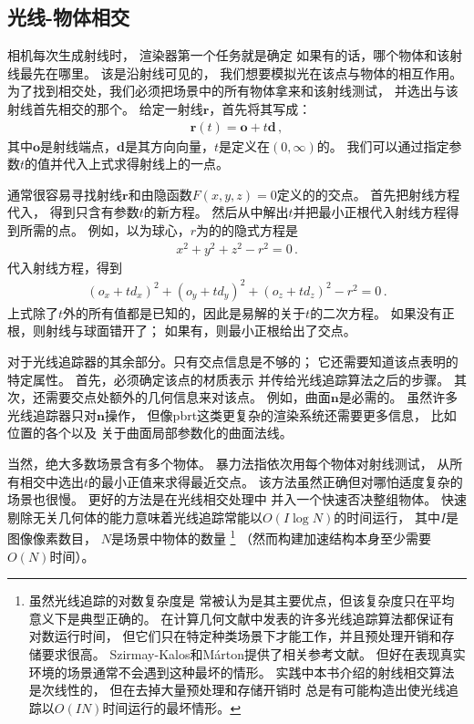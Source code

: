 \subsection{光线-物体相交}\label{sub:光线-物体相交}

相机每次生成射线时，
渲染器第一个任务就是确定
如果有的话，哪个物体和该射线最先在哪里。
该是沿射线可见的，
我们想要模拟光在该点与物体的相互作用。
为了找到相交处，我们必须把场景中的所有物体拿来和该射线测试，
并选出与该射线首先相交的那个。
给定一射线${\bm r}$，首先将其写成：
\begin{align*}
      {\bm r}(t)={\bm o}+t{\bm d}\, ,
\end{align*}
其中${\bm o}$是射线端点，${\bm d}$是其方向向量，$t$是定义在$(0,\infty)$的。
我们可以通过指定参数$t$的值并代入上式求得射线上的一点。

通常很容易寻找射线${\bm r}$和由隐函数$F(x,y,z)=0$定义的的交点。
首先把射线方程代入，
得到只含有参数$t$的新方程。
然后从中解出$t$并把最小正根代入射线方程得到所需的点。
例如，以为球心，$r$为的的隐式方程是
\begin{align*}
      x^2+y^2+z^2-r^2=0\, .
\end{align*}
代入射线方程，得到
\begin{align*}
      (o_x+td_x)^2+(o_y+td_y)^2+(o_z+td_z)^2-r^2=0\, .
\end{align*}
上式除了$t$外的所有值都是已知的，因此是易解的关于$t$的二次方程。
如果没有正根，则射线与球面错开了；
如果有，则最小正根给出了交点。

对于光线追踪器的其余部分。只有交点信息是不够的；
它还需要知道该点表明的特定属性。
首先，必须确定该点的材质表示
并传给光线追踪算法之后的步骤。
其次，还需要交点处额外的几何信息来对该点。
例如，曲面${\bm n}$是必需的。
虽然许多光线追踪器只对${\bm n}$操作，
但像pbrt这类更复杂的渲染系统还需要更多信息，
比如位置的各个以及
关于曲面局部参数化的曲面法线。

当然，绝大多数场景含有多个物体。
暴力法指依次用每个物体对射线测试，
从所有相交中选出$t$的最小正值来求得最近交点。
该方法虽然正确但对哪怕适度复杂的场景也很慢。
更好的方法是在光线相交处理中
并入一个快速否决整组物体。
快速剔除无关几何体的能力意味着光线追踪常能以$O(I\log{N})$的时间运行，
其中$I$是图像像素数目，
$N$是场景中物体的数量
\footnote{虽然光线追踪的对数复杂度是
      常被认为是其主要优点，但该复杂度只在平均意义下是典型正确的。
      在计算几何文献中发表的许多光线追踪算法都保证有对数运行时间，
      但它们只在特定种类场景下才能工作，并且预处理开销和存储要求很高。
      Szirmay-Kalos和Márton提供了相关参考文献\protect\citep{10.1007/BF02684409}。
      但好在表现真实环境的场景通常不会遇到这种最坏的情形。
      实践中本书介绍的射线相交算法是次线性的，
      但在去掉大量预处理和存储开销时
      总是有可能构造出使光线追踪以$O(IN)$时间运行的最坏情形。}
（然而构建加速结构本身至少需要$O(N)$时间）。

